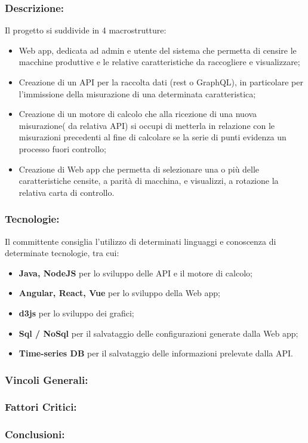 \subsubsection{Descrizione:}
Il progetto si suddivide in 4 macrostrutture:
\begin{itemize}
	\item Web app, dedicata ad admin e utente del sistema che permetta di censire le macchine produttive e le relative caratteristiche da raccogliere e visualizzare;
	\item Creazione di un API per la raccolta dati (rest o GraphQL), in particolare per l’immissione della misurazione di una determinata caratteristica;
	\item Creazione di un motore di calcolo che alla ricezione di una nuova misurazione( da relativa API) si occupi di metterla in relazione con le misurazioni precedenti al fine di calcolare se la serie di punti evidenza un processo fuori controllo; 
	\item Creazione di Web app che permetta di selezionare una o più delle caratteristiche censite, a parità di macchina, e visualizzi, a rotazione la relativa carta di controllo.
\end{itemize}

\subsubsection{Tecnologie:}
Il committente consiglia l’utilizzo di determinati linguaggi e conoscenza di determinate tecnologie, tra cui:
\begin{itemize}
	\item \textbf{Java, NodeJS} per lo sviluppo delle API e il motore di calcolo;
	\item \textbf{Angular, React, Vue} per lo sviluppo della Web app;
	\item \textbf{d3js} per lo sviluppo dei grafici;
	\item \textbf{Sql / NoSql} per il salvataggio delle configurazioni generate dalla Web app;
	\item \textbf{Time-series DB} per il salvataggio delle informazioni prelevate dalla API.
\end{itemize}

\subsubsection{Vincoli Generali:}

\subsubsection{Fattori Critici:}

\subsubsection{Conclusioni:}